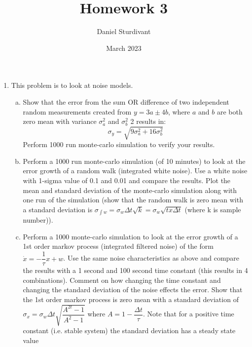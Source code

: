 \documentclass[11pt]{article}
\author{Daniel Sturdivant}
\title{Homework 3}
\date{March 2023}
\begin{document}
\maketitle
\thispagestyle{fancy}
\setlength{\parindent}{0pt}

\begin{enumerate}[label=\textbf{\arabic*.}]
  \itemsep 24pt
  
  \item This problem is to look at noise models.
  \begin{enumerate}[(a)]
    \itemsep -2pt
    \item Show that the error from the sum OR difference of two independent 
    random measurements created from $y=3a\pm4b$, where $a$ and $b$ are both 
    zero mean with variance $\sigma_a^2$ and $\sigma_b^2$ 2 results in:
    \begin{equation*}
      \sigma_y = \sqrt{9\sigma_a^2 + 16\sigma_b^2}
    \end{equation*}
    Perform 1000 run monte-carlo simulation to verify your results.
    \item Perform a 1000 run monte-carlo simulation (of 10 minutes) to look at 
    the error growth of a random walk (integrated white noise). Use a white 
    noise with 1-sigma value of 0.1 and 0.01 and compare the results. Plot the 
    mean and standard deviation of the monte-carlo simulation along with one 
    run of the simulation (show that the random walk is zero mean with a standard 
    deviation is $\sigma_{\int w} = \sigma_w\Delta t\sqrt{k} = \sigma_w\sqrt{tx\Delta t}$ 
    (where k is sample number)).
    \item Perform a 1000 monte-carlo simulation to look at the error growth of 
    a 1st order markov process (integrated filtered noise) of the form $\dot{x} = 
    -\dfrac{1}{\tau}x+w$. Use the same noise characteristics as above and compare 
    the results with a 1 second and 100 second time constant (this results in 4 
    combinations). Comment on how changing the time constant and changing the 
    standard deviation of the noise effects the error. Show that the 1st order
    markov process is zero mean with a standard deviation of $\sigma_x=\sigma_w 
    \Delta t\sqrt{\dfrac{A^{2t}-1}{A^2-1}}$ where $A=1-\dfrac{\Delta t}{\tau}$. 
    Note that for a positive time constant (i.e. stable system) the standard
    deviation has a steady state value
  \end{enumerate}

\end{enumerate}
\end{document}

